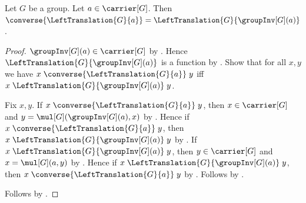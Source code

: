 \begin{lemma}\label{left_translation_converse}
    Let $G$ be a group.
    Let $a\in\carrier[G]$.
    Then $\converse{\LeftTranslation{G}{a}}
        =\LeftTranslation{G}{\groupInv[G](a)}$.
\end{lemma}
\begin{proof}
    $\groupInv[G](a)\in\carrier[G]$ by .
    Hence $\LeftTranslation{G}{\groupInv[G](a)}$ is a function
        by .
    Show that for all $x,y$ we have
        $x\mathrel{\converse{\LeftTranslation{G}{a}}}y$ iff
        $x\mathrel{\LeftTranslation{G}{\groupInv[G](a)}}y$.
    \begin{subproof}
        Fix $x,y$.
        If $x\mathrel{\converse{\LeftTranslation{G}{a}}}y$, then
            $x\in\carrier[G]$ and
            $y=\mul[G](\groupInv[G](a),x)$
            by
            .
        Hence if $x\mathrel{\converse{\LeftTranslation{G}{a}}}y$, then
            $x\mathrel{\LeftTranslation{G}{\groupInv[G](a)}}y$
            by .
        If $x\mathrel{\LeftTranslation{G}{\groupInv[G](a)}}y$, then
            $y\in\carrier[G]$ and $x=\mul[G](a,y)$
            by
            .
        Hence if $x\mathrel{\LeftTranslation{G}{\groupInv[G](a)}}y$, then
            $x\mathrel{\converse{\LeftTranslation{G}{a}}}y$
            by .
        Follows by \auto.
    \end{subproof}
    Follows by
        .
\end{proof}

